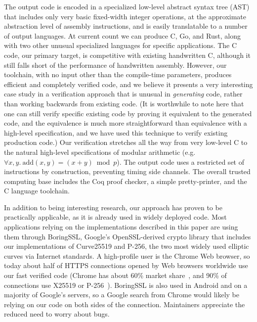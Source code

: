\documentclass[letterpaper,twocolumn,10pt]{article}
\begin{document}
The output code is encoded in a specialized low-level abstract syntax tree (AST) that includes only very basic fixed-width integer operations, at the approximate abstraction level of assembly instructions, and is easily translatable to a number of output languages.
At current count we can produce C, Go, and Rust, along with two other unusual specialized languages for specific applications.
The C code, our primary target, is competitive with existing handwritten C, although it still falls short of the performance of handwritten assembly.
However, our toolchain, with no input other than the compile-time parameters, produces efficient and completely verified code, and we believe it presents a very interesting case study in a verification approach that is unusual in \emph{generating} code, rather than working backwards from existing code.
(It is worthwhile to note here that one can still verify specific existing code by proving it equivalent to the generated code, and the equivalence is much more straightforward than equivalence with a high-level specification, and we have used this technique to verify existing production code.)
Our verification stretches all the way from very low-level C to the natural high-level specifications of modular arithmetic (e.g. $\forall x, y.\ \text{add}(x, y) = (x + y) \bmod p$).
The output code uses a restricted set of instructions by construction, preventing timing side channels.
The overall trusted computing base includes the Coq proof checker, a simple pretty-printer, and the C language toolchain.

In addition to being interesting research, our approach has proven to be practically applicable, as it is already used in widely deployed code.
Most applications relying on the implementations described in this paper are using them through BoringSSL, Google's OpenSSL-derived crypto library that includes our implementations of Curve25519 and P-256, the two most widely used elliptic curves via Internet standards.
A high-profile user is the Chrome Web browser, so today about half of HTTPS connections opened by Web browsers worldwide use our fast verified code (Chrome has about 60\% market share~\cite{browserMarketShare2020}, and 90\% of connections use X25519 or P-256~\cite{davidenTLSECC}).
BoringSSL is also used in Android and on a majority of Google's servers, so a Google search from Chrome would likely be relying on our code on both sides of the connection.
Maintainers appreciate the reduced need to worry about bugs.
\end{document}

